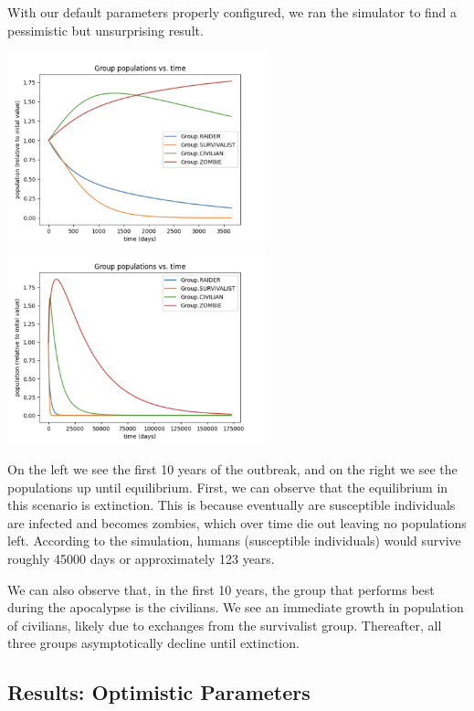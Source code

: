 \documentclass{article}
\begin{document}
With our default parameters properly configured, we ran the simulator to find a pessimistic but unsurprising result.

\begin{center}
    \includegraphics[width=7.5cm]{default_10_year.png}
    \includegraphics[width=7.5cm]{default_until_extinction.png}
\end{center}

On the left we see the first 10 years of the outbreak, and on the right we see the populations up until equilibrium. First, we can observe that the equilibrium in this scenario is extinction. This is because eventually are susceptible individuals are infected and becomes zombies, which over time die out leaving no populations left. According to the simulation, humans (susceptible individuals) would survive roughly 45000 days or approximately 123 years.

We can also observe that, in the first 10 years, the group that performs best during the apocalypse is the civilians. We see an immediate growth in population of civilians, likely due to exchanges from the survivalist group. Thereafter, all three groups asymptotically decline until extinction.

\subsection{Results: Optimistic Parameters}
\end{document}
